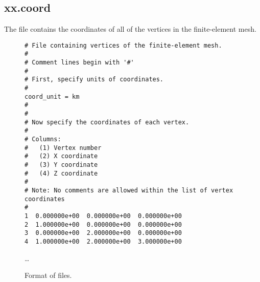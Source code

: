 \subsection{xx.coord}

The  file contains the coordinates of all of the
vertices in the finite-element mesh.

\begin{figure}
  \begin{center}
\begin{verbatim}
# File containing vertices of the finite-element mesh.
#
# Comment lines begin with '#'
#
# First, specify units of coordinates.
#
coord_unit = km
#
#
# Now specify the coordinates of each vertex.
#
# Columns:
#   (1) Vertex number
#   (2) X coordinate
#   (3) Y coordinate
#   (4) Z coordinate
#
# Note: No comments are allowed within the list of vertex coordinates
#
1  0.000000e+00  0.000000e+00  0.000000e+00
2  1.000000e+00  0.000000e+00  0.000000e+00
3  0.000000e+00  2.000000e+00  0.000000e+00
4  1.000000e+00  2.000000e+00  3.000000e+00
\end{verbatim}
    \ldots
    \caption{Format of  files.}
  \end{center}
\end{figure}
